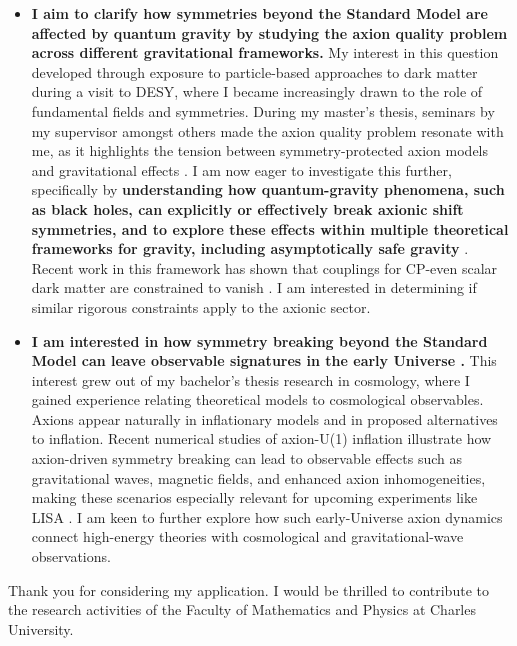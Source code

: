 \documentclass[a4paper, 11pt]{article}
\begin{document}
\begin{itemize}
    
    \item \textbf{I aim to clarify how symmetries beyond the Standard Model are affected by quantum gravity by studying the axion quality problem across different gravitational frameworks.} My interest in this question developed through exposure to particle-based approaches to dark matter during a visit to DESY, where I became increasingly drawn to the role of fundamental fields and symmetries. During my master’s thesis, seminars by my supervisor amongst others made the axion quality problem resonate with me, as it highlights the tension between symmetry-protected axion models and gravitational effects \cite{Kallosh1995}. I am now eager to investigate this further, specifically by \textbf{understanding how quantum-gravity phenomena, such as black holes, can explicitly or effectively break axionic shift symmetries, and to explore these effects within multiple theoretical frameworks for gravity, including asymptotically safe gravity} \cite{Arvanitaki2011,Doneva2022,EichhornSchiffer2020}. Recent work in this framework has shown that couplings for CP-even scalar dark matter are constrained to vanish \cite{Assant2025}. I am interested in determining if similar rigorous constraints apply to the axionic sector. 
    \item \textbf{I am interested in how symmetry breaking beyond the Standard Model can leave observable signatures in the early Universe \cite{Arvanitaki2010}.} This interest grew out of my bachelor’s thesis research in cosmology, where I gained experience relating theoretical models to cosmological observables. Axions appear naturally in inflationary models and in proposed alternatives to inflation. Recent numerical studies of axion-U(1) inflation illustrate how axion-driven symmetry breaking can lead to observable effects such as gravitational waves, magnetic fields, and enhanced axion inhomogeneities, making these scenarios especially relevant for upcoming experiments like LISA \cite{Sharma2024}. I am keen to further explore how such early-Universe axion dynamics connect high-energy theories with cosmological and gravitational-wave observations.

    

\end{itemize}

\vspace{1cm}
\noindent
Thank you for considering my application. I would be thrilled to contribute to the research activities of the Faculty of Mathematics and Physics at Charles University.


\printbibliography
\end{document}
